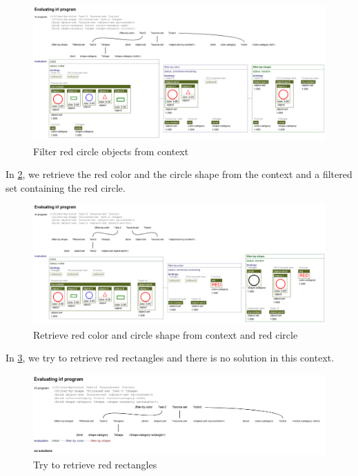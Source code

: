 \documentclass[a4paper,10pt]{article}
\begin{document}
\begin{figure}[!h]
    \centering
    \includegraphics[width=1.0\textwidth]{filter-color-shape-1-evaluation.png}
    \caption{Filter red circle objects from context}
    \label{fig:filter-color-shape-1-evaluation}
\end{figure}

In \ref{fig:filter-color-shape-2-evaluation}, we retrieve the red color and the circle shape from the context and a filtered set containing the red circle.

\begin{figure}[!h]
    \centering
    \includegraphics[width=1.0\textwidth]{filter-color-shape-2-evaluation.png}
    \caption{Retrieve red color and circle shape from context and red circle}
    \label{fig:filter-color-shape-2-evaluation}
\end{figure}

In \ref{fig:filter-color-shape-3-evaluation}, we try to retrieve red rectangles and there is no solution in this context.

\begin{figure}[!h]
    \centering
    \includegraphics[width=1.0\textwidth]{filter-color-shape-3-evaluation.png}
    \caption{Try to retrieve red rectangles}
    \label{fig:filter-color-shape-3-evaluation}
\end{figure}
\end{document}
